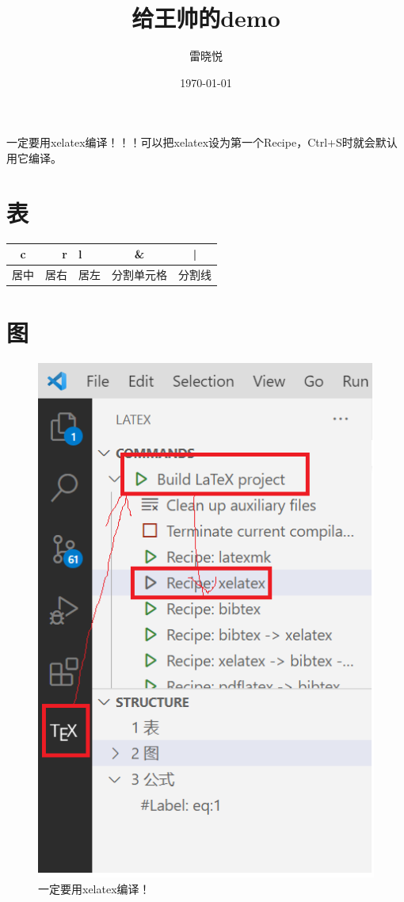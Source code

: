 \documentclass[UTF8]{ctexart}
\title{给王帅的demo}
\author{雷晓悦}
\date{\today}
\begin{document}
    \maketitle
    一定要用xelatex编译！！！可以把xelatex设为第一个Recipe，Ctrl+S时就会默认用它编译。
    \section{表}
    \begin{center}
        \begin{tabular}{c r l c|c}
            \hline
            c & r & l & \& & | \\
            \hline\hline
            居中 & 居右 & 居左 & 分割单元格 & 分割线\\
            \hline
        \end{tabular}
    \end{center}

    \section{图} %
    
    \begin{figure}[h]
        \centering
        \includegraphics[width=0.3\linewidth]{xelatex_compiler.png}
        \caption{一定要用xelatex编译！}
    \end{figure}
\end{document}
